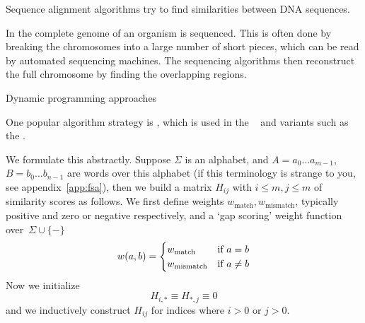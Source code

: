 
Sequence alignment algorithms try to find similarities between 
DNA sequences.

In  the complete genome of an 
organism is sequenced. This is often done by breaking the chromosomes
into a large number of short pieces, which can be read by automated
sequencing machines. The sequencing algorithms then reconstruct
the full chromosome by finding the overlapping regions.

 {Dynamic programming approaches}

One popular  algorithm strategy is
, which is used in the
~\cite{NeedlemanWunsch}
and variants such as the
.

We formulate this abstractly. Suppose $\Sigma$ is an alphabet, 
and $A=a_0\ldots a_{m-1}$, $B=b_0\ldots b_{n-1}$ are words over this alphabet
(if this terminology is strange to you, see appendix~\ref{app:fsa}),
then we build a matrix $H_{ij}$ with $i\leq m, j\leq m$
of similarity scores as follows.
%
\newcommand\wm{w_{\mathrm{match}}}
\newcommand\ws{w_{\mathrm{mismatch}}}
\newcommand\wdel{w_{\mathrm{deletion}}}
We first define weights $\wm,\ws$, typically positive and zero or negative 
respectively, and a `gap scoring' weight function over~$\Sigma\cup\{-\}$
\[ w(a,b)=
\begin{cases}
  \wm&\hbox{if $a=b$}\\ \ws&\hbox{if $a\not=b$}
\end{cases}
\]
Now we initialize
\[ H_{i,*}\equiv H_{*,j}\equiv 0 \]
and we inductively construct $H_{ij}$ for indices where $i>0$ or $j>0$.

